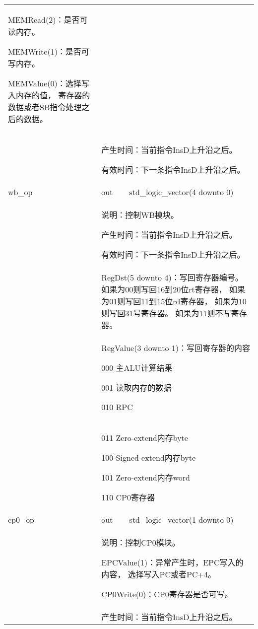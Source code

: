 \begin{tabularx}{\textwidth}{lll}
{                MEMRead(2)：是否可读内存。

                MEMWrite(1)：是否可写内存。

                MEMValue(0)：选择写入内存的值，%
                寄存器的数据或者SB指令处理之后的数据。
            } \\
            &
            \multicolumn{2}{X}{
                产生时间：当前指令InsD上升沿之后。

                有效时间：下一条指令InsD上升沿之后。
            } \\
            \midrule
            wb\_op          & out       & std\_logic\_vector(4 downto 0) \\
            \cmidrule(l){2-3}
            &
            \multicolumn{2}{X}{
                说明：控制WB模块。

                产生时间：当前指令InsD上升沿之后。

                有效时间：下一条指令InsD上升沿之后。 
            } \\
            &
            \multicolumn{2}{X}{
                RegDst(5 downto 4)：写回寄存器编号。
                如果为00则写回16到20位rt寄存器，%
                如果为01则写回11到15位rd寄存器，%
                如果为10则写回31号寄存器。
                如果为11则不写寄存器。
            } \\
            &
            \multicolumn{2}{X}{
                RegValue(3 downto 1)：写回寄存器的内容%

                000 主ALU计算结果

                001 读取内存的数据

                010 RPC
            } \\
            &
            \multicolumn{2}{X}{
                011 Zero-extend内存byte

                100 Signed-extend内存byte

                101 Zero-extend内存word

                110 CP0寄存器
            } \\
            \midrule
            cp0\_op         & out       & std\_logic\_vector(1 downto 0) \\
            \cmidrule(l){2-3}
            &
            \multicolumn{2}{X}{
                说明：控制CP0模块。

                EPCValue(1)：异常产生时，EPC写入的内容，%
                选择写入PC或者PC+4。

                CP0Write(0)：CP0寄存器是否可写。
            } \\
            &
            \multicolumn{2}{X}{
                产生时间：当前指令InsD上升沿之后。

}
\end{tabularx}
